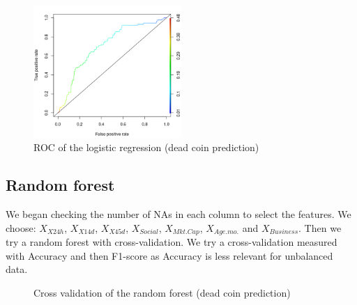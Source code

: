 \documentclass[11pt, english, letterpaper]{article}
\begin{document}
\begin{figure}[!h]
    \centering
    \includegraphics[width=0.5\textwidth]{ROC.png}
    \caption{ROC of the logistic regression (dead coin prediction)}
\end{figure}

\subsection{Random forest}

We began checking the number of NAs in each column to select the features. We choose: $X_{X24h}$, $X_{X14d}$, $X_{X45d}$, $X_{Social}$, $X_{Mkt. Cap}$, $X_{Age. mo.}$ and $X_{Business}$.
Then we try a random forest with cross-validation. We try a cross-validation measured with Accuracy and then F1-score as Accuracy is less relevant for unbalanced data.

\begin{figure}[!h]
    \centering
    \qquad
    \caption{Cross validation of the random forest (dead coin prediction)}%
    \label{CV_RF}%
\end{figure}
\end{document}
